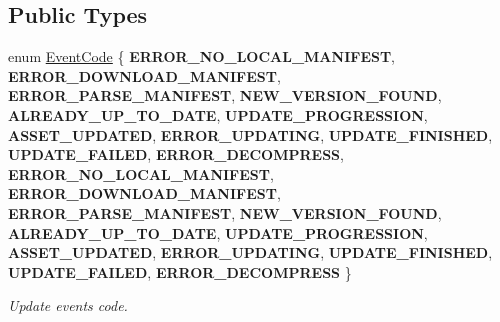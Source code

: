 \subsection*{Public Types}
\begin{DoxyCompactItemize}
\item 
\mbox{\label{classEventAssetsManagerEx_ae48992cd906169f84a146e7ae8851cae}} 
enum \hyperlink{classEventAssetsManagerEx_ae48992cd906169f84a146e7ae8851cae}{Event\+Code} \{ \newline
{\bfseries E\+R\+R\+O\+R\+\_\+\+N\+O\+\_\+\+L\+O\+C\+A\+L\+\_\+\+M\+A\+N\+I\+F\+E\+ST}, 
{\bfseries E\+R\+R\+O\+R\+\_\+\+D\+O\+W\+N\+L\+O\+A\+D\+\_\+\+M\+A\+N\+I\+F\+E\+ST}, 
{\bfseries E\+R\+R\+O\+R\+\_\+\+P\+A\+R\+S\+E\+\_\+\+M\+A\+N\+I\+F\+E\+ST}, 
{\bfseries N\+E\+W\+\_\+\+V\+E\+R\+S\+I\+O\+N\+\_\+\+F\+O\+U\+ND}, 
\newline
{\bfseries A\+L\+R\+E\+A\+D\+Y\+\_\+\+U\+P\+\_\+\+T\+O\+\_\+\+D\+A\+TE}, 
{\bfseries U\+P\+D\+A\+T\+E\+\_\+\+P\+R\+O\+G\+R\+E\+S\+S\+I\+ON}, 
{\bfseries A\+S\+S\+E\+T\+\_\+\+U\+P\+D\+A\+T\+ED}, 
{\bfseries E\+R\+R\+O\+R\+\_\+\+U\+P\+D\+A\+T\+I\+NG}, 
\newline
{\bfseries U\+P\+D\+A\+T\+E\+\_\+\+F\+I\+N\+I\+S\+H\+ED}, 
{\bfseries U\+P\+D\+A\+T\+E\+\_\+\+F\+A\+I\+L\+ED}, 
{\bfseries E\+R\+R\+O\+R\+\_\+\+D\+E\+C\+O\+M\+P\+R\+E\+SS}, 
{\bfseries E\+R\+R\+O\+R\+\_\+\+N\+O\+\_\+\+L\+O\+C\+A\+L\+\_\+\+M\+A\+N\+I\+F\+E\+ST}, 
\newline
{\bfseries E\+R\+R\+O\+R\+\_\+\+D\+O\+W\+N\+L\+O\+A\+D\+\_\+\+M\+A\+N\+I\+F\+E\+ST}, 
{\bfseries E\+R\+R\+O\+R\+\_\+\+P\+A\+R\+S\+E\+\_\+\+M\+A\+N\+I\+F\+E\+ST}, 
{\bfseries N\+E\+W\+\_\+\+V\+E\+R\+S\+I\+O\+N\+\_\+\+F\+O\+U\+ND}, 
{\bfseries A\+L\+R\+E\+A\+D\+Y\+\_\+\+U\+P\+\_\+\+T\+O\+\_\+\+D\+A\+TE}, 
\newline
{\bfseries U\+P\+D\+A\+T\+E\+\_\+\+P\+R\+O\+G\+R\+E\+S\+S\+I\+ON}, 
{\bfseries A\+S\+S\+E\+T\+\_\+\+U\+P\+D\+A\+T\+ED}, 
{\bfseries E\+R\+R\+O\+R\+\_\+\+U\+P\+D\+A\+T\+I\+NG}, 
{\bfseries U\+P\+D\+A\+T\+E\+\_\+\+F\+I\+N\+I\+S\+H\+ED}, 
\newline
{\bfseries U\+P\+D\+A\+T\+E\+\_\+\+F\+A\+I\+L\+ED}, 
{\bfseries E\+R\+R\+O\+R\+\_\+\+D\+E\+C\+O\+M\+P\+R\+E\+SS}
 \}\begin{DoxyCompactList}\small\item\em Update events code. \end{DoxyCompactList}
\item 
\mbox{\label{classEventAssetsManagerEx_ae48992cd906169f84a146e7ae8851cae}} 

\end{DoxyCompactItemize}
